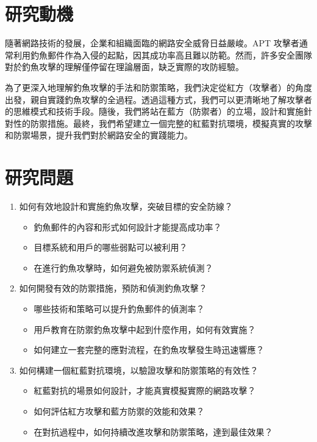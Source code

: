 \documentclass[a4paper,12pt]{article}
\begin{document}
\section{研究動機}
隨著網路技術的發展，企業和組織面臨的網路安全威脅日益嚴峻。APT 攻擊者通常利用釣魚郵件作為入侵的起點，因其成功率高且難以防範。然而，許多安全團隊對於釣魚攻擊的理解僅停留在理論層面，缺乏實際的攻防經驗。

為了更深入地理解釣魚攻擊的手法和防禦策略，我們決定從紅方（攻擊者）的角度出發，親自實踐釣魚攻擊的全過程。透過這種方式，我們可以更清晰地了解攻擊者的思維模式和技術手段。隨後，我們將站在藍方（防禦者）的立場，設計和實施針對性的防禦措施。最終，我們希望建立一個完整的紅藍對抗環境，模擬真實的攻擊和防禦場景，提升我們對於網路安全的實踐能力。

\section{研究問題}
\begin{enumerate}
  \item 如何有效地設計和實施釣魚攻擊，突破目標的安全防線？
    \begin{itemize}
      \item 釣魚郵件的內容和形式如何設計才能提高成功率？
      \item 目標系統和用戶的哪些弱點可以被利用？
      \item 在進行釣魚攻擊時，如何避免被防禦系統偵測？
    \end{itemize}
  \item 如何開發有效的防禦措施，預防和偵測釣魚攻擊？
    \begin{itemize}
      \item 哪些技術和策略可以提升釣魚郵件的偵測率？
      \item 用戶教育在防禦釣魚攻擊中起到什麼作用，如何有效實施？
      \item 如何建立一套完整的應對流程，在釣魚攻擊發生時迅速響應？
    \end{itemize}
  \item 如何構建一個紅藍對抗環境，以驗證攻擊和防禦策略的有效性？
    \begin{itemize}
      \item 紅藍對抗的場景如何設計，才能真實模擬實際的網路攻擊？
      \item 如何評估紅方攻擊和藍方防禦的效能和效果？
      \item 在對抗過程中，如何持續改進攻擊和防禦策略，達到最佳效果？
    \end{itemize}
\end{enumerate}
\end{document}
